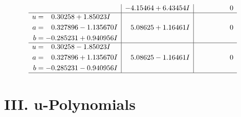 \documentclass[1p]{elsarticle_modified}
\theoremstyle{definition}
\begin{document}
$$\begin{array}{c|c|c}
 & -4.15464 + 6.43454 I & \phantom{-0.000000 } 0 \\ \hline\begin{aligned}
u &= \phantom{-}0.30258 + 1.85023 I \\
a &= \phantom{-}0.327896 - 1.135670 I \\
b &= -0.285231 + 0.940956 I\end{aligned}
 & \phantom{-}5.08625 + 1.16461 I & \phantom{-0.000000 } 0 \\ \hline\begin{aligned}
u &= \phantom{-}0.30258 - 1.85023 I \\
a &= \phantom{-}0.327896 + 1.135670 I \\
b &= -0.285231 - 0.940956 I\end{aligned}
 & \phantom{-}5.08625 - 1.16461 I & \phantom{-0.000000 } 0\\
 \hline 
 \end{array}$$\newpage
\newpage\renewcommand{\arraystretch}{1}
\centering \section*{ III. u-Polynomials}
\end{document}

